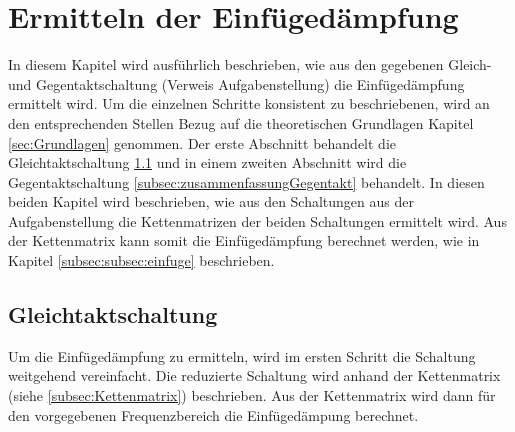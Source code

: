 \section{Ermitteln der Einfügedämpfung} \label{sec:umsetzung}
In diesem Kapitel wird ausführlich beschrieben, wie aus den gegebenen Gleich- und Gegentaktschaltung (Verweis Aufgabenstellung) die Einfügedämpfung ermittelt wird. Um die einzelnen Schritte konsistent zu beschriebenen, wird an den entsprechenden Stellen Bezug auf die theoretischen Grundlagen Kapitel \ref{sec:Grundlagen} genommen. Der erste Abschnitt behandelt die Gleichtaktschaltung \ref{subsec:zusammenfassungGleichtakt} und in einem zweiten Abschnitt wird die Gegentaktschaltung \ref{subsec:zusammenfassungGegentakt} behandelt. In diesen beiden Kapitel wird beschrieben, wie aus den Schaltungen aus der Aufgabenstellung die Kettenmatrizen der beiden Schaltungen ermittelt wird. Aus der Kettenmatrix kann somit die Einfügedämpfung berechnet werden, wie in Kapitel \ref{subsec:subsec:einfuge} beschrieben.


\subsection{Gleichtaktschaltung}\label{subsec:zusammenfassungGleichtakt}
Um die Einfügedämpfung zu ermitteln, wird im ersten Schritt die Schaltung weitgehend vereinfacht. Die reduzierte Schaltung wird anhand der Kettenmatrix (siehe \ref{subsec:Kettenmatrix}) beschrieben. Aus der Kettenmatrix wird dann für den vorgegebenen Frequenzbereich die Einfügedämpung berechnet.


